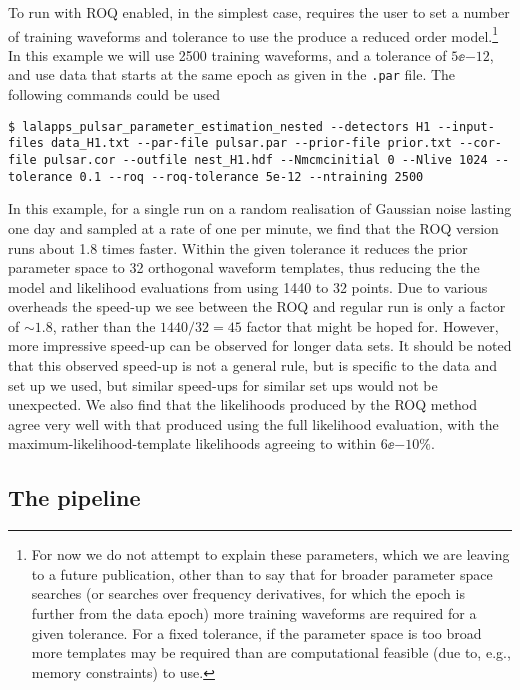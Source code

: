 To run with ROQ enabled, in the simplest case, requires the user to set a number of training waveforms and tolerance to use the produce a reduced order
model.\footnote{For now we do not attempt to explain these parameters, which we are leaving to a future publication, other than to say that for broader
parameter space searches (or searches over frequency derivatives, for which the epoch is further from the data epoch) more training waveforms are required
for a given tolerance. For a fixed tolerance, if the parameter space is too broad more templates may be required than are computational feasible (due to, e.g.,
memory constraints) to use.} In this example we will use 2500 training waveforms, and a tolerance of $5\ee{-12}$, and use data that starts at the same
epoch as given in the {\tt .par} file. The following commands could be used
\begin{lstlisting}[frame=single]
$ lalapps_pulsar_parameter_estimation_nested --detectors H1 --input-files data_H1.txt --par-file pulsar.par --prior-file prior.txt --cor-file pulsar.cor --outfile nest_H1.hdf --Nmcmcinitial 0 --Nlive 1024 --tolerance 0.1 --roq --roq-tolerance 5e-12 --ntraining 2500
\end{lstlisting}

In this example, for a single run on a random realisation of Gaussian noise lasting one day and sampled at a rate of one per minute, we find that the ROQ
version runs about 1.8 times faster. Within the given tolerance it reduces the prior parameter space to 32 orthogonal waveform templates, thus reducing the
the model and likelihood evaluations from using 1440 to 32 points. Due to various overheads the speed-up we see between the ROQ and regular run is only a factor
of $\sim 1.8$, rather than the $1440/32 = 45$ factor that might be hoped for. However, more impressive speed-up can be observed for longer data sets. It should be
noted that this observed speed-up is not a general rule, but is specific to the data and set up we used, but similar speed-ups for similar set ups would not be
unexpected. We also find that the likelihoods produced by the ROQ method agree very well with that produced using the full likelihood evaluation, with the
maximum-likelihood-template likelihoods agreeing to within $6\ee{-10}\%$.

\subsection{The pipeline}


